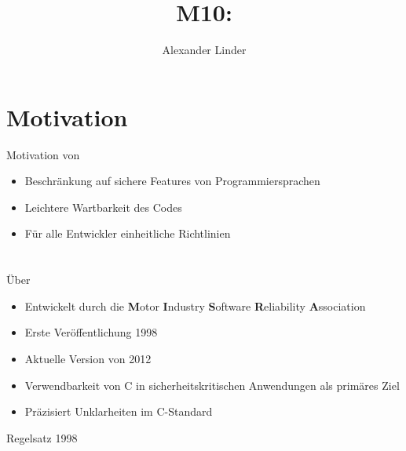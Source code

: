 \documentclass{beamer}
\title{M10: \sqss}
\author[Linder]{Alexander Linder}
\date{} %
\institute{FAKULTÄT FÜR INFORMATIK}
\begin{document}

    \begin{frame}
        \maketitle
    \end{frame}

    \begin{frame}
        \tableofcontents
    \end{frame}

    \section{Motivation}
    \label{sec:motivation}
    \begin{frame}{Motivation von \sqss}
        \begin{itemize}
            \item Beschränkung auf sichere Features von Programmiersprachen
            \item Leichtere Wartbarkeit des Codes
            \item Für alle Entwickler einheitliche Richtlinien
        \end{itemize}
    \end{frame}

    \section{\misra}
    \label{sec:misra-c}
    \begin{frame}{Über \misra}
        \begin{itemize}
            \item Entwickelt durch die \textbf{M}otor \textbf{I}ndustry \textbf{S}oftware \textbf{R}eliability \textbf{A}ssociation
            \item Erste Veröffentlichung 1998
            \item Aktuelle Version von 2012
            \item Verwendbarkeit von C in sicherheitskritischen Anwendungen als primäres Ziel
            \item Präzisiert Unklarheiten im C-Standard
        \end{itemize}
    \end{frame}

    \begin{frame}{Regelsatz 1998}
        \begin{center}
            
        \end{center}
    \end{frame}
\end{document}
